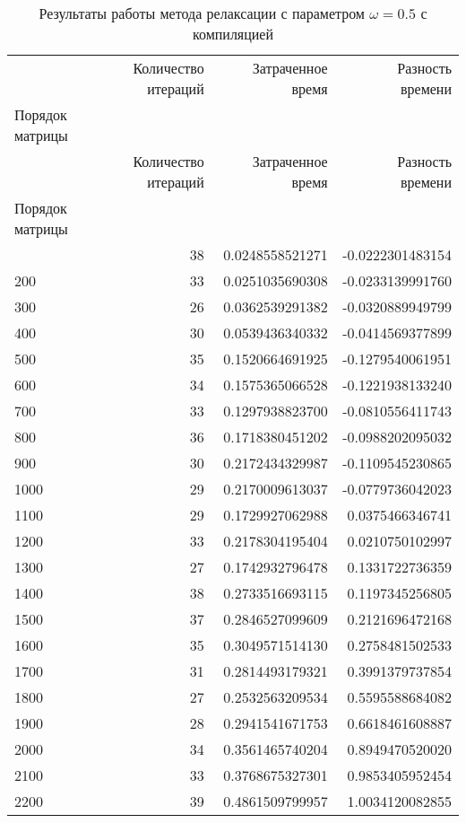 \begin{longtable}{lrrr}
\caption{Результаты работы метода релаксации с параметром $\omega=0.5$ с компиляцией} \\
\toprule
 & Количество итераций & Затраченное время & Разность времени \\
Порядок матрицы &  &  &  \\
\midrule
\endfirsthead
\toprule
 & Количество итераций & Затраченное время & Разность времени \\
Порядок матрицы &  &  &  \\
\midrule
\endhead
\midrule
\midrule
\endfoot
\bottomrule
\endlastfoot
100 & 38 & 0.0248558521271 & -0.0222301483154 \\
200 & 33 & 0.0251035690308 & -0.0233139991760 \\
300 & 26 & 0.0362539291382 & -0.0320889949799 \\
400 & 30 & 0.0539436340332 & -0.0414569377899 \\
500 & 35 & 0.1520664691925 & -0.1279540061951 \\
600 & 34 & 0.1575365066528 & -0.1221938133240 \\
700 & 33 & 0.1297938823700 & -0.0810556411743 \\
800 & 36 & 0.1718380451202 & -0.0988202095032 \\
900 & 30 & 0.2172434329987 & -0.1109545230865 \\
1000 & 29 & 0.2170009613037 & -0.0779736042023 \\
1100 & 29 & 0.1729927062988 & 0.0375466346741 \\
1200 & 33 & 0.2178304195404 & 0.0210750102997 \\
1300 & 27 & 0.1742932796478 & 0.1331722736359 \\
1400 & 38 & 0.2733516693115 & 0.1197345256805 \\
1500 & 37 & 0.2846527099609 & 0.2121696472168 \\
1600 & 35 & 0.3049571514130 & 0.2758481502533 \\
1700 & 31 & 0.2814493179321 & 0.3991379737854 \\
1800 & 27 & 0.2532563209534 & 0.5595588684082 \\
1900 & 28 & 0.2941541671753 & 0.6618461608887 \\
2000 & 34 & 0.3561465740204 & 0.8949470520020 \\
2100 & 33 & 0.3768675327301 & 0.9853405952454 \\
2200 & 39 & 0.4861509799957 & 1.0034120082855 \\

\end{longtable}
